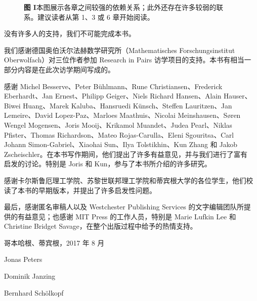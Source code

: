 \begin{figure}[p]
\centering

\caption*{\textbf{图 I}\quad 本图展示各章之间较强的依赖关系；此外还存在许多较弱的联系。建议读者从第 1、3 或 6 章开始阅读。}
\end{figure}

没有许多人的支持，我们不可能完成本书。

我们感谢德国奥伯沃尔法赫数学研究所（Mathematisches Forschungsinstitut Oberwolfach）对三位作者参加 Research in Pairs 访学项目的支持。本书有相当一部分内容是在此次访学期间写成的。

感谢 Michel Besserve、Peter Bühlmann、Rune Christiansen、Frederick Eberhardt、Jan Ernest、Philipp Geiger、Niels Richard Hansen、Alain Hauser、Biwei Huang、Marek Kaluba、Hansruedi Künsch、Steffen Lauritzen、Jan Lemeire、David Lopez-Paz、Marloes Maathuis、Nicolai Meinshausen、Søren Wengel Mogensen、Joris Mooij、Krikamol Muandet、Judea Pearl、Niklas Pfister、Thomas Richardson、Mateo Rojas-Carulla、Eleni Sgouritsa、Carl Johann Simon-Gabriel、Xiaohai Sun、Ilya Tolstikhin、Kun Zhang 和 Jakob Zscheischler。在本书写作期间，他们提出了许多有益意见，并与我们进行了富有启发的讨论。特别是 Joris 和 Kun，参与了本书所介绍的许多研究。

感谢卡尔斯鲁厄理工学院、苏黎世联邦理工学院和蒂宾根大学的各位学生，他们校读了本书的早期版本，并提出了许多启发性问题。

最后，感谢匿名审稿人以及 Westchester Publishing Services 的文字编辑团队所提供的有益意见；也感谢 MIT Press 的工作人员，特别是 Marie Lufkin Lee 和 Christine Bridget Savage，在整个出版过程中给予的热情支持。

\begin{flushright}
哥本哈根、蒂宾根，2017 年 8 月\par
Jonas Peters\par
Dominik Janzing\par
Bernhard Schölkopf
\end{flushright}
